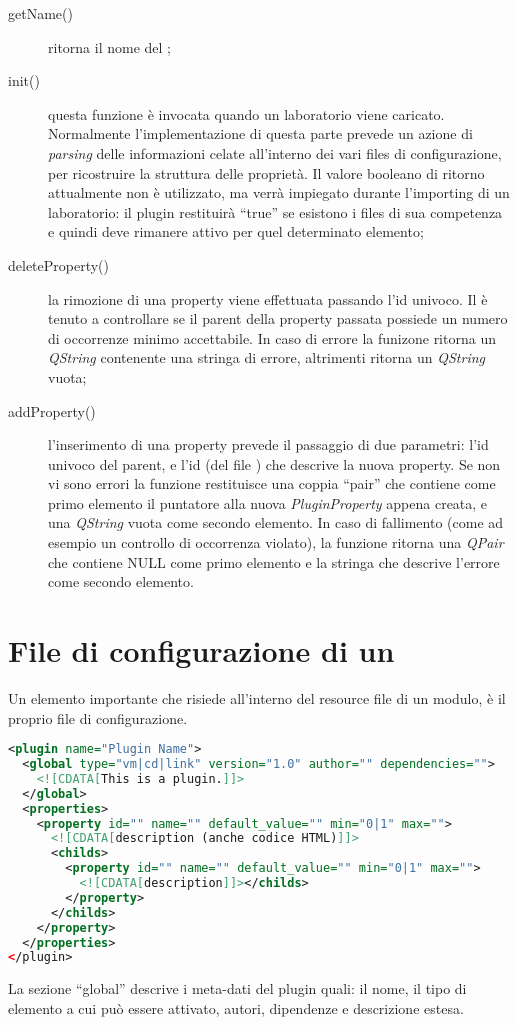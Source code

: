 \begin{description}
\item[getName()] ritorna il nome del \plugin{};

\item[init()] questa funzione è invocata quando un laboratorio viene caricato. Normalmente l'implementazione di questa parte prevede un azione di \emph{parsing} delle informazioni celate all'interno dei vari files di configurazione, per ricostruire la struttura delle proprietà. Il valore booleano di ritorno attualmente non è utilizzato, ma verrà impiegato durante l'importing di un laboratorio: il plugin restituirà ``true'' se esistono i files di sua competenza e quindi deve rimanere attivo per quel determinato elemento;

\item[deleteProperty()] la rimozione di una property viene effettuata passando l'id univoco. Il \plugin{} è tenuto a controllare se il parent della property passata possiede un numero di occorrenze minimo accettabile. In caso di errore la funizone ritorna un \emph{QString} contenente una stringa di errore, altrimenti ritorna un \emph{QString} vuota;

\item[addProperty()] l'inserimento di una property prevede il passaggio di due parametri: l'id univoco del parent, e l'id (del file \xml{}) che descrive la nuova property. Se non vi sono errori la funzione restituisce una coppia ``pair'' che contiene come primo elemento il puntatore alla nuova \emph{PluginProperty} appena creata, e una \emph{QString} vuota come secondo elemento. In caso di fallimento (come ad esempio un controllo di occorrenza violato), la funzione ritorna una \emph{QPair} che contiene NULL come primo elemento e la stringa che descrive l'errore come secondo elemento.
\end{description}

\section*{File di configurazione di un \plugin{}}
Un elemento importante che risiede all'interno del resource file di un modulo, è il proprio file di configurazione.
\begin{lstlisting}[language=xml]
<plugin name="Plugin Name">
  <global type="vm|cd|link" version="1.0" author="" dependencies="">
    <![CDATA[This is a plugin.]]>
  </global>
  <properties>
    <property id="" name="" default_value="" min="0|1" max="">
      <![CDATA[description (anche codice HTML)]]>
      <childs>
        <property id="" name="" default_value="" min="0|1" max="">
          <![CDATA[description]]></childs>
        </property>
      </childs>
    </property> 
  </properties>
</plugin>
\end{lstlisting}
La sezione ``global'' descrive i meta-dati del plugin quali: il nome, il tipo di elemento a cui può essere attivato, autori, dipendenze e descrizione estesa.

